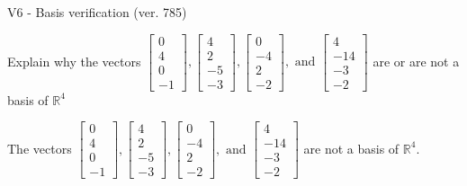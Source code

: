 \begin{exercise}
  \begin{exerciseTitle}V6 - Basis verification (ver. 785)\end{exerciseTitle}
  \begin{exerciseStatement}
    Explain why the vectors \(\left[\begin{array}{r}
0 \\
4 \\
0 \\
-1
\end{array}\right] , \left[\begin{array}{r}
4 \\
2 \\
-5 \\
-3
\end{array}\right] , \left[\begin{array}{r}
0 \\
-4 \\
2 \\
-2
\end{array}\right] , \text{ and } \left[\begin{array}{r}
4 \\
-14 \\
-3 \\
-2
\end{array}\right]\) are or are not a basis of \(\mathbb{R}^4\)	


  \end{exerciseStatement}
  \begin{exerciseAnswer}
   The vectors \(\left[\begin{array}{r}
0 \\
4 \\
0 \\
-1
\end{array}\right] , \left[\begin{array}{r}
4 \\
2 \\
-5 \\
-3
\end{array}\right] , \left[\begin{array}{r}
0 \\
-4 \\
2 \\
-2
\end{array}\right] , \text{ and } \left[\begin{array}{r}
4 \\
-14 \\
-3 \\
-2
\end{array}\right]\) 
  	 are not  a basis of \(\mathbb{R}^4\).
  


  \end{exerciseAnswer}
\end{exercise}